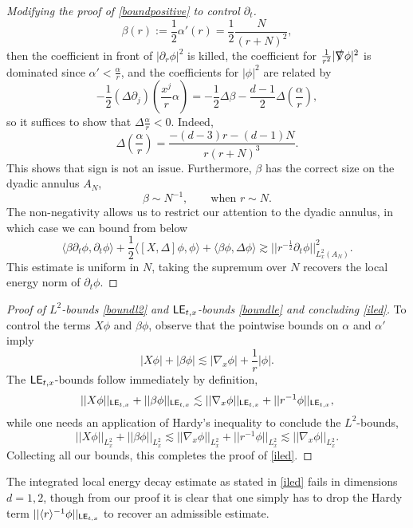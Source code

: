 \begin{proof}[Modifying the proof of \eqref{boundpositive} to control $\partial_t$]
		\[
			\beta(r) := \frac12\alpha'(r)= \frac12\frac{N}{(r + N)^2},
		\]	
	then the coefficient in front of $|\partial_r \phi|^2$ is killed, the coefficient for $\tfrac1{r^2} |\slashed \nabla \phi|^2$ is dominated since $\alpha' < \tfrac\alpha r$, and the coefficients for $|\phi|^2$ are related by 
		\[
			-\frac12 (\Delta \partial_j) \left( \frac{x^j}{r} \alpha \right) = -\frac12 \Delta \beta - \frac{d - 1}2 \Delta \left( \frac{\alpha}{r} \right),
		\]
	so it suffices to show that $\Delta \tfrac{\alpha}{r} < 0$. Indeed, 
		\[
			\Delta \left( \frac{\alpha}{r} \right) = \frac{- (d - 3) r - (d - 1) N}{r (r + N)^3}. 
		\]	
	This shows that sign is not an issue. Furthermore, $\beta$ has the correct size on the dyadic annulus $A_N$, 
		\[
			\beta \sim N^{-1}, \qquad \text{when $r \sim N$}.
		\]	
	The non-negativity allows us to restrict our attention to the dyadic annulus, in which case we can bound from below
		\[
			\langle \beta \partial_t \phi, \partial_t \phi \rangle + \frac12 \langle [X, \Delta ] \phi, \phi \rangle + \langle \beta \phi, \Delta \phi \rangle \gtrsim ||r^{-\frac12} \partial_t \phi ||_{L^2_x (A_N)}^2. 
		\]	
	This estimate is uniform in $N$, taking the supremum over $N$ recovers the local energy norm of $\partial_t \phi$.
\end{proof}
	

\begin{proof}[Proof of $L^2$-bounds \eqref{boundl2} and $\mathsf{LE}_{t, x}$-bounds \eqref{boundle} and concluding \eqref{iled}]
	To control the terms $X\phi$ and $\beta \phi$, observe that the pointwise bounds on $\alpha$ and $\alpha'$ imply 
		\[
			|X\phi| + |\beta \phi| \lesssim |\nabla_x \phi| + \frac1r |\phi|. 
		\]
	The $\mathsf{LE}_{t,x}$-bounds follow immediately by definition, 
		\[
			||X\phi||_{\mathsf{LE}_{t, x}} + ||\beta\phi||_{\mathsf{LE}_{t, x}} \lesssim ||\nabla_x \phi||_{\mathsf{LE}_{t, x}} + ||r^{-1} \phi||_{\mathsf{LE}_{t, x}},
		\]	
	while one needs an application of Hardy's inequality to conclude the $L^2$-bounds,
		\[
			||X\phi||_{L^2_x} + ||\beta \phi||_{L^2_x}\lesssim ||\nabla_x \phi||_{L^2_x} + ||r^{-1} \phi||_{L^2_x} \lesssim ||\nabla_x \phi||_{L^2_x}.
		\]
	Collecting all our bounds, this completes the proof of \eqref{iled}.	
\end{proof}

\begin{remark}
	The integrated local energy decay estimate as stated in \eqref{iled} fails in dimensions $d = 1, 2$, though from our proof it is clear that one simply has to drop the Hardy term $||\langle r \rangle^{-1} \phi||_{\mathsf{LE}_{t, x}}$ to recover an admissible estimate. 
\end{remark}

